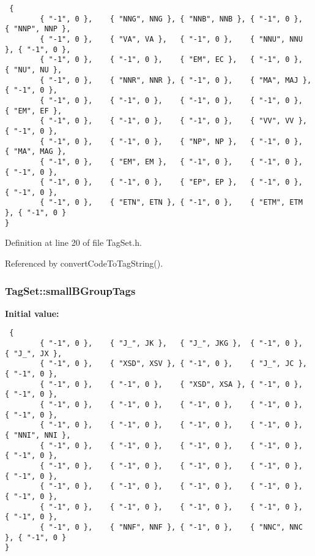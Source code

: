 \begin{Code}\begin{verbatim} {
        { "-1", 0 },    { "NNG", NNG }, { "NNB", NNB }, { "-1", 0 },    { "NNP", NNP },
        { "-1", 0 },    { "VA", VA },   { "-1", 0 },    { "NNU", NNU }, { "-1", 0 },
        { "-1", 0 },    { "-1", 0 },    { "EM", EC },   { "-1", 0 },    { "NU", NU },
        { "-1", 0 },    { "NNR", NNR }, { "-1", 0 },    { "MA", MAJ },  { "-1", 0 },
        { "-1", 0 },    { "-1", 0 },    { "-1", 0 },    { "-1", 0 },    { "EM", EF },
        { "-1", 0 },    { "-1", 0 },    { "-1", 0 },    { "VV", VV },   { "-1", 0 },
        { "-1", 0 },    { "-1", 0 },    { "NP", NP },   { "-1", 0 },    { "MA", MAG },
        { "-1", 0 },    { "EM", EM },   { "-1", 0 },    { "-1", 0 },    { "-1", 0 },
        { "-1", 0 },    { "-1", 0 },    { "EP", EP },   { "-1", 0 },    { "-1", 0 },
        { "-1", 0 },    { "ETN", ETN }, { "-1", 0 },    { "ETM", ETM }, { "-1", 0 }
}
\end{verbatim}
\end{Code}


Definition at line 20 of file TagSet.h.

Referenced by convertCodeToTagString().\hypertarget{classkmaOrange_1_1TagSet_ce82d1fbb91c0cd836d5792a859d6a35}{
\subsubsection[{smallBGroupTags}]{ {\bf TagSet::smallBGroupTags}}}
\label{classkmaOrange_1_1TagSet_ce82d1fbb91c0cd836d5792a859d6a35}


\textbf{Initial value:}

\begin{Code}\begin{verbatim} {
        { "-1", 0 },    { "J_", JK },   { "J_", JKG },  { "-1", 0 },    { "J_", JX },
        { "-1", 0 },    { "XSD", XSV }, { "-1", 0 },    { "J_", JC },   { "-1", 0 },
        { "-1", 0 },    { "-1", 0 },    { "XSD", XSA }, { "-1", 0 },    { "-1", 0 },
        { "-1", 0 },    { "-1", 0 },    { "-1", 0 },    { "-1", 0 },    { "-1", 0 },
        { "-1", 0 },    { "-1", 0 },    { "-1", 0 },    { "-1", 0 },    { "NNI", NNI },
        { "-1", 0 },    { "-1", 0 },    { "-1", 0 },    { "-1", 0 },    { "-1", 0 },
        { "-1", 0 },    { "-1", 0 },    { "-1", 0 },    { "-1", 0 },    { "-1", 0 },
        { "-1", 0 },    { "-1", 0 },    { "-1", 0 },    { "-1", 0 },    { "-1", 0 },
        { "-1", 0 },    { "-1", 0 },    { "-1", 0 },    { "-1", 0 },    { "-1", 0 },
        { "-1", 0 },    { "NNF", NNF }, { "-1", 0 },    { "NNC", NNC }, { "-1", 0 }
}
\end{verbatim}
\end{Code}


